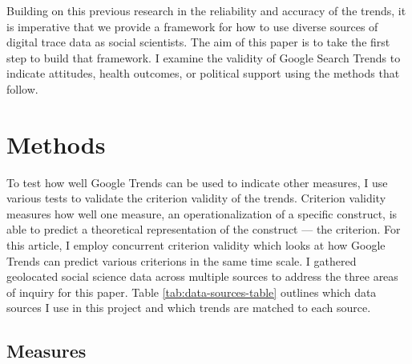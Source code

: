 Building on this previous research in the reliability and accuracy of the
trends, it is imperative that we provide a framework for how to use diverse
sources of digital trace data as social scientists. The aim of this paper is to
take the first step to build that framework. I examine the validity of Google
Search Trends to indicate attitudes, health outcomes, or political support using
the methods that follow.

\section{Methods}

To test how well Google Trends can be used to indicate other measures, I use
various tests to validate the criterion validity of the trends. Criterion
validity measures how well one measure, an operationalization of a specific
construct, is able to predict a theoretical representation of the construct —
the criterion. For this article, I employ concurrent criterion validity which
looks at how Google Trends can predict various criterions in the same time
scale. I gathered geolocated social science data across multiple sources to
address the three areas of inquiry for this paper.  Table
\ref{tab:data-sources-table} outlines which data sources I use in this project
and which trends are matched to each source.



\subsection{Measures}

